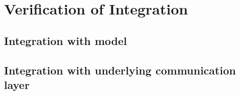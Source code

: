 
\chapter{Verification of Integration}
\label{cha:integration}

\section{Integration with \scade model}

\section{Integration with underlying communication layer}

